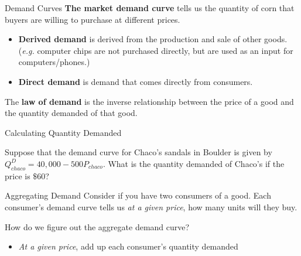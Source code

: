 \documentclass[12pt,t]{beamer}
\begin{document}
\begin{frame}{Demand Curves}
  \textbf{The market demand curve} tells us the quantity of corn that buyers are willing to purchase at different prices.
  \begin{itemize}
    \item \textbf{Derived demand} is derived from the production and sale of other goods. (\emph{e.g.} computer chips are not purchased directly, but are used as an input for computers/phones.)
    \item \textbf{Direct demand} is demand that comes directly from consumers.
  \end{itemize}

  \pause\bigskip
  The \textbf{law of demand} is the inverse relationship between the price of a good and the quantity demanded of that good.
\end{frame}

\begin{frame}{Calculating Quantity Demanded}

\bigskip
Suppose that the demand curve for Chaco's sandals in Boulder is given by $Q^D_{chaco} = 40,000  - 500P_{chaco}$. What is the quantity demanded of Chaco's if the price is $ \$ 60 $?

\end{frame}

\begin{frame}{Aggregating Demand}
  Consider if you have two consumers of a good. Each consumer's demand curve tells us \emph{at a given price}, how many units will they buy.

  \bigskip
  How do we figure out the aggregate demand curve? 
  
  \pause 
  \begin{itemize}
    \item \emph{At a given price}, add up each consumer's quantity demanded
  \end{itemize}
\end{frame}
\end{document}
